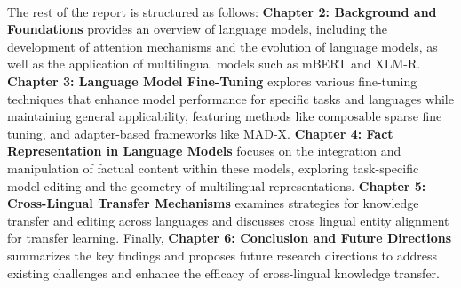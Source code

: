 \paragraph{} The rest of the report is structured as follows: \textbf{Chapter 2: Background and Foundations} provides an overview of language models, including the development of attention mechanisms and the evolution of language models, as well as the application of multilingual models such as mBERT and XLM-R. \textbf{Chapter 3: Language Model Fine-Tuning} explores various fine-tuning techniques that enhance model performance for specific tasks and languages while maintaining general applicability, featuring methods like composable sparse fine tuning, and adapter-based frameworks like MAD-X. \textbf{Chapter 4: Fact Representation in Language Models} focuses on the integration and manipulation of factual content within these models, exploring task-specific model editing and the geometry of multilingual representations. \textbf{Chapter 5: Cross-Lingual Transfer Mechanisms} examines strategies for knowledge transfer and editing across languages and discusses cross lingual entity alignment for transfer learning. Finally, \textbf{Chapter 6: Conclusion and Future Directions} summarizes the key findings and proposes future research directions to address existing challenges and enhance the efficacy of cross-lingual knowledge transfer.
